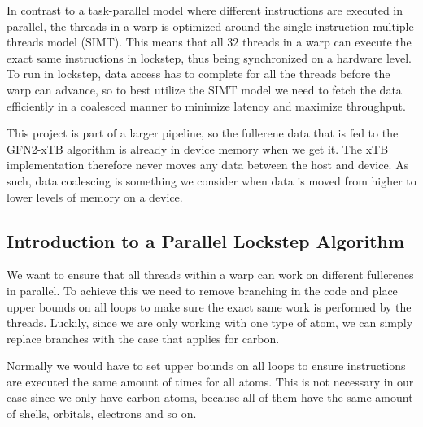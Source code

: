 
In contrast to a task-parallel model where different instructions are executed in parallel, the threads in a warp is optimized around the single instruction multiple threads model (SIMT). This means that all $32$ threads in a warp can execute the exact same instructions in lockstep, thus being synchronized on a hardware level. To run in lockstep, data access has to complete for all the threads before the warp can advance, so to best utilize the SIMT model we need to fetch the data efficiently in a coalesced manner to minimize latency and maximize throughput.

This project is part of a larger pipeline, so the fullerene data that is fed to the GFN2-xTB algorithm is already in device memory when we get it. The xTB implementation therefore never moves any data between the host and device. As such, data coalescing is something we consider when data is moved from higher to lower levels of memory on a device.


\subsection{Introduction to a Parallel Lockstep Algorithm}

We want to ensure that all threads within a warp can work on different fullerenes in parallel. To achieve this we need to remove branching in the code and place upper bounds on all loops to make sure the exact same work is performed by the threads. Luckily, since we are only working with one type of atom, we can simply replace branches with the case that applies for carbon.

Normally we would have to set upper bounds on all loops to ensure instructions are executed the same amount of times for all atoms. This is not necessary in our case since we only have carbon atoms, because all of them have the same amount of shells, orbitals, electrons and so on.

